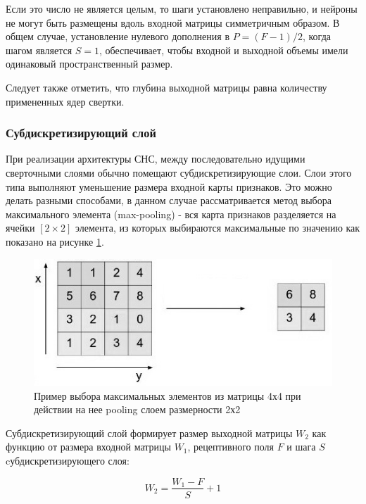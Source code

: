 \documentclass[14pt]{article}
\numberwithin{figure}{section}
\numberwithin{equation}{section}
\begin{document}
Если это число не является целым, то шаги установлено неправильно, и нейроны не могут быть размещены вдоль входной матрицы симметричным образом. В общем случае, установление нулевого дополнения в $P = (F - 1) / 2$, когда шагом является $S = 1$, обеспечивает, чтобы входной и выходной объемы имели одинаковый пространственный размер.

Следует также отметить, что глубина выходной матрицы равна количеству примененных ядер свертки.

\subsubsection{Субдискретизирующий слой}

При реализации архитектуры СНС, между последовательно идущими сверточными слоями обычно помещают субдискретизирующие слои. Слои этого типа выполняют уменьшение размера входной карты признаков. Это можно делать разными способами, в данном случае рассматривается метод выбора максимального элемента (max-pooling) - вся карта признаков разделяется на ячейки $[2 \times 2]$ элемента, из которых выбираются максимальные по значению как показано на рисунке \ref{ris:7}.

\begin{figure}[h]
	\begin{center}
		\includegraphics[scale=0.7] {7.JPG}
		\caption{Пример выбора максимальных элементов из матрицы 4х4 при действии на нее pooling слоем размерности 2х2}
		\label{ris:7}
	\end{center}
\end{figure}

Субдискретизирующий слой формирует размер выходной матрицы $W_2$ как функцию от размера входной матрицы $W_1$, рецептивного поля $F$ и шага $S$ cубдискретизирующего слоя\cite{Stanford}:

\begin{equation}
	W_2 = \frac{W_1 - F}{S} + 1
\end{equation}
\end{document}
